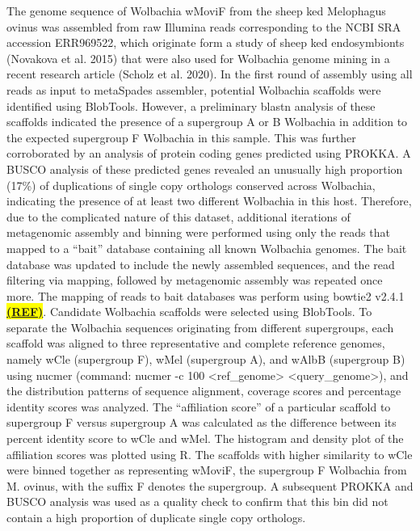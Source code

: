 \documentclass[10pt, a4paper, twocolumn]{article} %
\begin{document}
The genome sequence of Wolbachia wMoviF from the sheep ked Melophagus ovinus was assembled from raw Illumina reads corresponding to the NCBI SRA accession ERR969522, which originate form a study of sheep ked endosymbionts (Novakova et al. 2015) that were also used for Wolbachia genome mining in a recent research article (Scholz et al. 2020). In the first round of assembly using all reads as input to metaSpades assembler, potential Wolbachia scaffolds were identified using BlobTools. However, a preliminary blastn analysis of these scaffolds indicated the presence of a supergroup A or B Wolbachia in addition to the expected supergroup F Wolbachia in this sample. This was further corroborated by an analysis of protein coding genes predicted using PROKKA. A BUSCO analysis of these predicted genes revealed an unusually high proportion (17\%) of duplications of single copy orthologs conserved across Wolbachia, indicating the presence of at least two different Wolbachia in this host.  Therefore, due to the complicated nature of this dataset, additional iterations of metagenomic assembly and binning were performed using only the reads that mapped to a “bait” database containing all known Wolbachia genomes. The bait database was updated to include the newly assembled sequences, and the read filtering via mapping, followed by metagenomic assembly was repeated once more. The mapping of reads to bait databases was perform using bowtie2 v2.4.1 \underline{\textbf{\colorbox{Yellow}{(REF)}}}. Candidate Wolbachia scaffolds were selected using BlobTools. To separate the Wolbachia sequences originating from different supergroups, each scaffold was aligned to three representative and complete reference genomes, namely wCle (supergroup F), wMel (supergroup A), and wAlbB (supergroup B) using nucmer (command: nucmer -c 100 <ref\_genome> <query\_genome>), and the distribution patterns of sequence alignment, coverage scores and percentage identity scores was analyzed. The “affiliation score” of a particular scaffold to supergroup F versus supergroup A was calculated as the difference between its percent identity score to wCle and wMel. The histogram and density plot of the affiliation scores was plotted using R. The scaffolds with higher similarity to wCle were binned together as representing wMoviF, the supergroup F Wolbachia from M. ovinus, with the suffix F denotes the supergroup. A subsequent PROKKA and BUSCO analysis was used as a quality check to confirm that this bin did not contain a high proportion of duplicate single copy orthologs.
\end{document}
